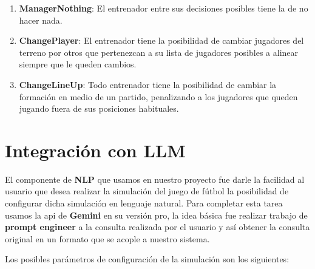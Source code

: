 \documentclass{article}
\begin{document}
\begin{enumerate}
      \item \textbf{ManagerNothing}: El entrenador entre sus decisiones posibles tiene la de no hacer nada.
            
      \item \textbf{ChangePlayer}: El entrenador tiene la posibilidad de cambiar jugadores del terreno por otros que pertenezcan a su lista de jugadores posibles a alinear siempre que le queden cambios.
            
      \item \textbf{ChangeLineUp}: Todo entrenador tiene la posibilidad de cambiar la formación en medio de un partido, penalizando a los jugadores que queden jugando fuera de sus posiciones habituales.
            
\end{enumerate}


\section{Integración con LLM}

El componente de \textbf{NLP} que usamos en nuestro proyecto fue darle la facilidad al usuario que desea realizar la simulación del 
juego de fútbol la posibilidad de configurar dicha simulación en lenguaje natural. Para completar esta tarea usamos la api de \textbf{Gemini}
en su versión pro, la idea básica fue realizar trabajo de \textbf{prompt engineer} a la consulta realizada por el usuario y así obtener
la consulta original en un formato que se acople a nuestro sistema.

Los posibles parámetros de configuración de la simulación son los siguientes:
\end{document}
